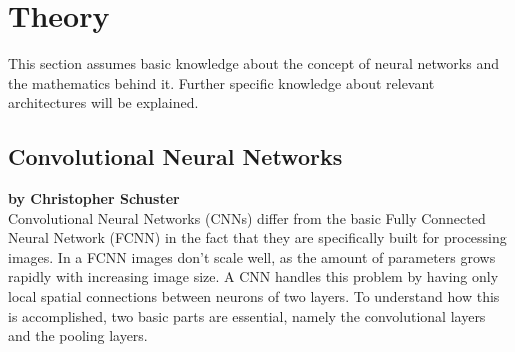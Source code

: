 \documentclass{article}
\begin{document}
\newpage
\section{Theory}
This section assumes basic knowledge about the concept of neural networks and the mathematics behind it. Further specific knowledge about relevant architectures will be explained.

\subsection{Convolutional Neural Networks}

\textbf{by Christopher Schuster} \\

Convolutional Neural Networks (CNNs) differ from the basic Fully Connected Neural Network (FCNN) in the fact that they are specifically built for processing images. In a FCNN images don't scale well, as the amount of parameters grows rapidly with increasing image size. A CNN handles this problem by having only local spatial connections between neurons of two layers. To understand how this is accomplished, two basic parts are essential, namely the convolutional layers and the pooling layers\cite{Goodfellow1}\cite{Stanford}.
\end{document}
